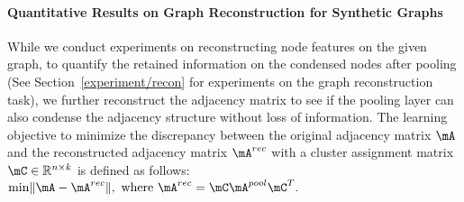 \begin{table}[t]
\small
\centering
\caption{\small Quantitative results of the graph reconstruction task on reconstructing the node features and the adjacency matrix for synthetic graphs, with two different minimization objectives and error calculation metrics: $\mX - \mX^{rec}$ and $\mA - \mA^{rec}$. * indicates the model without using adjacency normalization.}
\label{app:adj:recon}
\end{table}

\paragraph{Quantitative Results on Graph Reconstruction for Synthetic Graphs}
While we conduct experiments on reconstructing node features on the given graph, to quantify the retained information on the condensed nodes after pooling (See Section~\ref{experiment/recon} for experiments on the graph reconstruction task), we further reconstruct the adjacency matrix to see if the pooling layer can also condense the adjacency structure without loss of information. The learning objective to minimize the discrepancy between the original adjacency matrix $\mA$ and the reconstructed adjacency matrix $\mA^{rec}$ with a cluster assignment matrix $\mC \in \mathbb{R}^{n \times k}$ is defined as follows: 
$
    \min \lVert \mA - \mA^{rec} \rVert, \text{ where } \mA^{rec} = \mC \mA^{pool} \mC^T.
$

